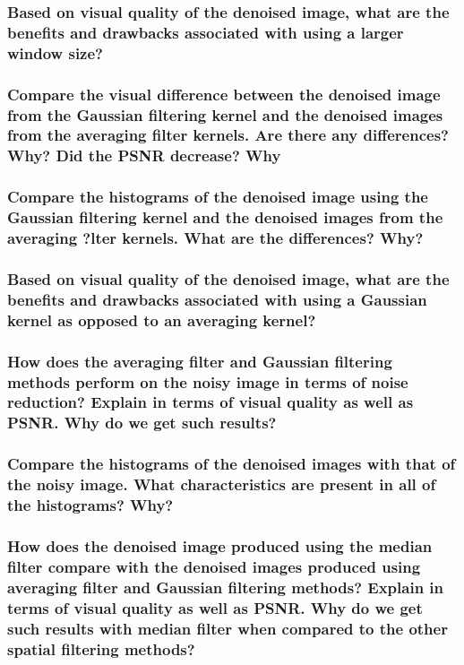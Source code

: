 \documentclass[article, 1.5space, letterpaper, 12pt, oneside, header, footer]{SydeClass}
\begin{document}
\subsubsection{Based on visual quality of the denoised image, what are the benefits and drawbacks associated with
using a larger window size?}


\subsubsection{Compare the visual difference between the denoised image from the Gaussian filtering kernel and the
denoised images from the averaging filter kernels. Are there any differences? Why? Did the PSNR
decrease? Why}


\subsubsection{Compare the histograms of the denoised image using the Gaussian filtering kernel and the denoised
images from the averaging ?lter kernels. What are the differences? Why?}


\subsubsection{Based on visual quality of the denoised image, what are the benefits and drawbacks associated with
using a Gaussian kernel as opposed to an averaging kernel?}


\subsubsection{How does the averaging filter and Gaussian filtering methods perform on the noisy image in terms of
noise reduction? Explain in terms of visual quality as well as PSNR. Why do we get such results?}


\subsubsection{Compare the histograms of the denoised images with that of the noisy image. What characteristics
are present in all of the histograms? Why?}


\subsubsection{How does the denoised image produced using the median filter compare with the denoised images
produced using averaging filter and Gaussian filtering methods? Explain in terms of visual quality
as well as PSNR. Why do we get such results with median filter when compared to the other spatial
filtering methods?}
\end{document}

